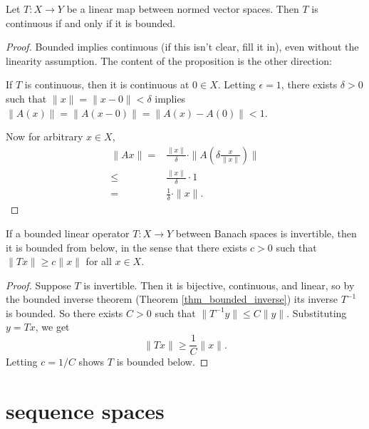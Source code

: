 \documentclass[12pt]{article}
\begin{document}
\begin{refsection}
\begin{proposition}
\label{prop_linear_continuous_bounded}
	Let $T:X\to Y$ be a linear map between normed vector spaces. Then $T$ is continuous if and only if it is bounded.
\end{proposition}
\begin{proof}
	Bounded implies continuous (if this isn't clear, fill it in), even without the linearity assumption. The content of the proposition is the other direction:

	If $T$ is continuous, then it is continuous at $0\in X$. Letting $\epsilon=1$, there exists $\delta>0$ such that $\|x\|=\|x-0\|<\delta$ implies $\|A(x)\|=\|A(x-0)\|=\|A(x)-A(0)\|<1$. 

	Now for arbitrary $x\in X$,
	\begin{align*}
		\|Ax\| =& \frac{\|x\|}{\delta} \cdot \| A(\delta \frac{x}{\|x\|})\| \\
		\leq& \frac{\|x\|}{\delta} \cdot 1 \\
		=& \frac{1}{\delta} \cdot \|x\|.
	\end{align*}
\end{proof}

\begin{proposition}
	If a bounded linear operator $T:X\to Y$ between Banach spaces is invertible, then it is bounded from below, in the sense that there exists $c>0$ such that $\|Tx\|\geq c\|x\|$ for all $x\in X$.
\end{proposition}
\begin{proof}
	Suppose $T$ is invertible. Then it is bijective, continuous, and linear, so by the bounded inverse theorem (Theorem \ref{thm_bounded_inverse}) its inverse $T^{-1}$ is bounded. So there exists $C>0$ such that $\|T^{-1}y\| \leq C\|y\|$. Substituting $y=Tx$, we get 
	\begin{equation*}
		\|Tx\| \geq \frac{1}{C}\|x\|.
	\end{equation*}
	Letting $c=1/C$ shows $T$ is bounded below.
\end{proof}

\nocite{pm_neumann_series}
\nocite{wikipedia_neumann_series}
\nocite{se_linear_cts_bounded}
\nocite{se_inv_bounded_below}
\printbibliography

\end{refsection}

\section{sequence spaces} %
\end{document}
